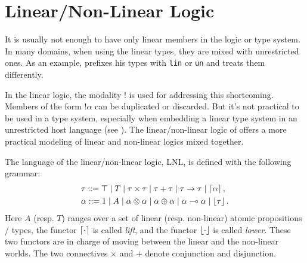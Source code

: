 \section{Linear/Non-Linear Logic}

It is usually not enough to have only linear members in the logic or type system. In many domains, when using the linear types, they are mixed with unrestricted ones. As an example, \cite{DavidWalker2004} prefixes his types with \texttt{lin} or \texttt{un} and treats them differently.

In the linear logic, the modality $!$ is used for addressing this shortcoming. Members of the form $!\alpha$ can be duplicated or discarded. But it's not practical to be used in a type system, especially when embedding a linear type system in an unrestricted host language (see \cite{JenniferPaykin2018}).
%
The linear/non-linear logic of \cite{DBLP:conf/csl/Benton94} offers a more practical modeling of linear and non-linear logics mixed together.

The language of the linear/non-linear logic, LNL, is defined with the following grammar:
\begin{align*}
    &\tau ::= \top \mid T \mid \tau \times \tau \mid \tau + \tau \mid \tau \rightarrow \tau \mid \left\lceil \alpha \right\rceil, \\
    &\alpha ::= 1 \mid A \mid \alpha \otimes \alpha \mid \alpha \oplus \alpha \mid \alpha \multimap \alpha \mid \left\lfloor \tau \right\rfloor.
\end{align*}
Here $A$ (resp. $T$) ranges over a set of linear (resp. non-linear) atomic propositions / types, the functor $\left\lceil \cdot \right\rceil$ is called \textit{lift}, and the functor $\left\lfloor \cdot \right\rfloor$ is called \textit{lower}. These two functors are in charge of moving between the linear and the non-linear worlds. The two connectives $\times$ and $+$ denote conjunction and disjunction.
